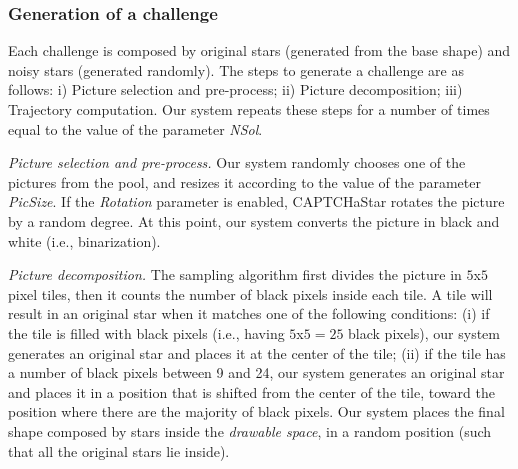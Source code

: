 \documentclass[conference]{IEEEtran}
\begin{document}
\subsubsection{Generation of a challenge}
Each challenge is composed by original stars (generated from the base shape) and noisy stars (generated randomly).
The steps to generate a challenge are as follows:
i) Picture selection and pre-process; ii) Picture decomposition; iii) Trajectory computation. Our system repeats these steps for a number of times equal to the value of the parameter \textit{NSol}.

\noindent\textit{Picture selection and pre-process.}
Our system randomly chooses one of the pictures from the pool, and resizes it according to the value of the parameter \textit{PicSize}.
If the \textit{Rotation} parameter is enabled, CAPTCHaStar rotates the picture by a random degree.
At this point, our system converts the picture in black and white (i.e., binarization). 

\noindent\textit{Picture decomposition.}
The sampling algorithm first divides the picture in $5$x$5$ pixel tiles, then it counts the number of black pixels inside each tile. 
A tile will result in an original star when it matches one of the following conditions:
(i) if the tile is filled with black pixels (i.e., having $5$x$5=25$ black pixels), our system generates an original star and places it at the center of the tile; (ii) if the tile has a number of black pixels between 9 and 24, our system generates an original star and places it in a position that is shifted from the center of the tile, toward the position where there are the majority of black pixels.
Our system places the final shape composed by stars inside the \textit{drawable space}, in a random position (such that all the original stars lie inside).
\end{document}

